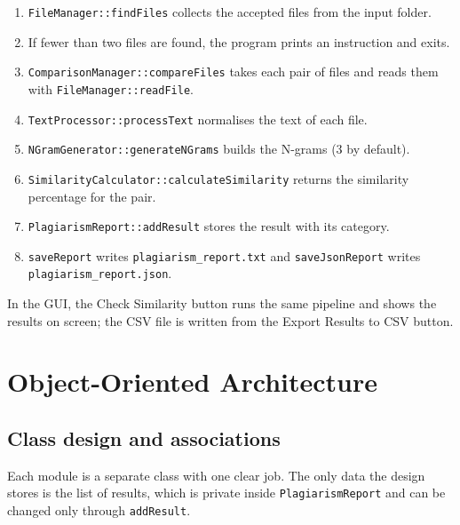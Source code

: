 \documentclass[12pt,a4paper,oneside]{book}
\begin{document}
\begin{enumerate}
  \item \texttt{FileManager::findFiles} collects the accepted files from the input folder.
  \item If fewer than two files are found, the program prints an instruction and exits.
  \item \texttt{ComparisonManager::compareFiles} takes each pair of files and reads them with \texttt{FileManager::readFile}.
  \item \texttt{TextProcessor::processText} normalises the text of each file.
  \item \texttt{NGramGenerator::generateNGrams} builds the N-grams (3 by default).
  \item \texttt{SimilarityCalculator::calculateSimilarity} returns the similarity percentage for the pair.
  \item \texttt{PlagiarismReport::addResult} stores the result with its category.
  \item \texttt{saveReport} writes \texttt{plagiarism\_report.txt} and \texttt{saveJsonReport} writes \texttt{plagiarism\_report.json}.
\end{enumerate}

In the GUI, the Check Similarity button runs the same pipeline and shows the results on screen; the CSV file is written from the Export Results to CSV button.

\section{Object-Oriented Architecture}
\subsection{Class design and associations}
Each module is a separate class with one clear job. The only data the design stores is the list of results, which is private inside \texttt{PlagiarismReport} and can be changed only through \texttt{addResult}.
\end{document}
